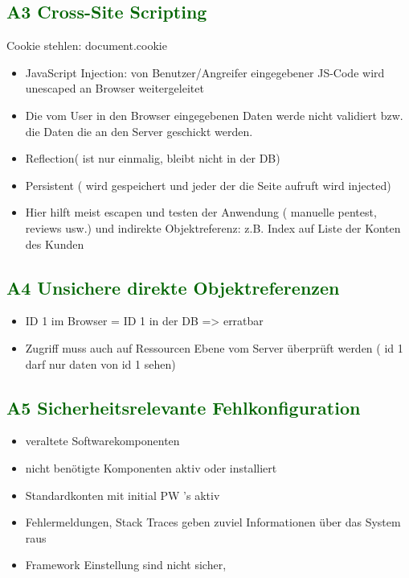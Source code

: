 \subsection*{\textcolor{darkgreen}{A3 Cross-Site Scripting}}
	Cookie stehlen: document.cookie
	\begin{itemize}
	\item JavaScript Injection: von Benutzer/Angreifer eingegebener JS-Code wird unescaped an Browser weitergeleitet
	\item Die vom User in den Browser eingegebenen Daten werde nicht validiert bzw. die Daten die an den Server geschickt werden. 
	\item Reflection( ist nur einmalig, bleibt nicht in der DB) 
	\item Persistent ( wird gespeichert und jeder der die Seite aufruft wird injected)
\item Hier hilft meist escapen und testen der Anwendung ( manuelle pentest, reviews usw.) und indirekte Objektreferenz: z.B. Index auf Liste der Konten des Kunden
	\end{itemize}
\subsection*{\textcolor{darkgreen}{A4 Unsichere direkte Objektreferenzen}}

	\begin{itemize}
	\item ID 1 im Browser = ID 1 in der DB => erratbar
	\item Zugriff muss auch auf Ressourcen Ebene vom Server überprüft werden ( id 1 darf nur daten von id 1 sehen)
	\end{itemize}



\subsection*{\textcolor{darkgreen}{A5 Sicherheitsrelevante Fehlkonfiguration}}

	\begin{itemize}
	\item veraltete Softwarekomponenten
	\item nicht benötigte Komponenten aktiv oder installiert
	\item Standardkonten mit initial PW\'{ '}s aktiv 
	\item Fehlermeldungen, Stack Traces geben zuviel Informationen über das System raus
	\item Framework Einstellung sind nicht sicher,
	\end{itemize}

